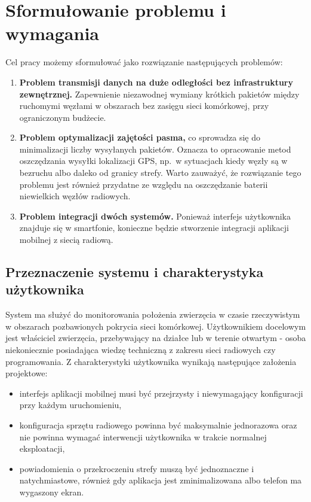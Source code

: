\newpage
\section{Sformułowanie problemu i wymagania}

Cel pracy możemy sformułować jako rozwiązanie następujących problemów:
\begin{enumerate}
    \item \textbf{Problem transmisji danych na duże odległości bez infrastruktury zewnętrznej.}
          Zapewnienie niezawodnej wymiany krótkich pakietów między ruchomymi węzłami
          w obszarach bez zasięgu sieci komórkowej, przy ograniczonym budżecie.
    \item \textbf{Problem optymalizacji zajętości pasma,} co sprowadza się do minimalizacji liczby
          wysyłanych pakietów. Oznacza to opracowanie metod oszczędzania wysyłki lokalizacji GPS,
          np.\ w sytuacjach kiedy węzły są w bezruchu albo daleko od granicy strefy. Warto zauważyć,
          że rozwiązanie tego problemu jest również przydatne ze względu na oszczędzanie baterii
          niewielkich węzłów radiowych.
    \item \textbf{Problem integracji dwóch systemów.} Ponieważ interfejs użytkownika znajduje się
          w smartfonie, konieczne będzie stworzenie integracji aplikacji mobilnej z siecią radiową.
\end{enumerate}

\subsection*{Przeznaczenie systemu i charakterystyka użytkownika}

System ma służyć do monitorowania położenia zwierzęcia w czasie rzeczywistym w obszarach
pozbawionych pokrycia sieci komórkowej. Użytkownikiem docelowym jest właściciel zwierzęcia,
przebywający na działce lub w terenie otwartym - osoba niekoniecznie posiadająca wiedzę techniczną
z zakresu sieci radiowych czy programowania. Z charakterystyki użytkownika wynikają następujące
założenia projektowe:
\begin{itemize}
    \item interfejs aplikacji mobilnej musi być przejrzysty i niewymagający konfiguracji
          przy każdym uruchomieniu,
    \item konfiguracja sprzętu radiowego powinna być maksymalnie jednorazowa oraz nie powinna
          wymagać interwencji użytkownika w trakcie normalnej eksploatacji,
    \item powiadomienia o przekroczeniu strefy muszą być jednoznaczne i natychmiastowe, również
          gdy aplikacja jest zminimalizowana albo telefon ma wygaszony ekran.
\end{itemize}

